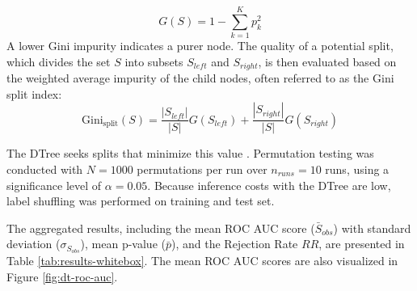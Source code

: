 \begin{equation}
  G(S) = 1 - \sum_{k=1}^{K} p_k^2
  \label{eq:gini_impurity}
\end{equation}
A lower Gini impurity indicates a purer node. The quality of a potential split, which divides the set $S$ into subsets $S_{left}$ and $S_{right}$, is then evaluated based on the weighted average impurity of the child nodes, often referred to as the Gini split index:
\begin{equation}
  \text{Gini}_{\text{split}}(S) = \frac{|S_{left}|}{|S|} G(S_{left}) + \frac{|S_{right}|}{|S|} G(S_{right})
  \label{eq:gini_split}
\end{equation}

The DTree seeks splits that minimize this value \autocite{breiman1984classification}. Permutation testing was conducted with $N = 1000$ permutations per run over $n_{runs}=10$ runs, using a significance level of $\alpha = 0.05$. Because inference costs with the DTree are low, label shuffling was performed on training and test set.

The aggregated results, including the mean ROC AUC score ($\bar{S}_{obs}$) with standard deviation ($\sigma_{S_{obs}}$), mean p-value ($\bar{p}$), and the Rejection Rate $RR$, are presented in Table \ref{tab:results-whitebox}. The mean ROC AUC scores are also visualized in Figure \ref{fig:dt-roc-auc}.

